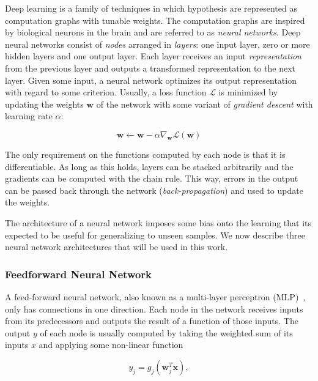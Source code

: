Deep learning is a family of techniques in which hypothesis are represented as computation graphs with tunable weights.
The computation graphs are inspired by biological neurons in the brain and are referred to as \textit{neural networks}.
Deep neural networks consist of \textit{nodes} arranged in \textit{layers}: one input layer, zero or more hidden layers and one output layer.
Each layer receives an input \textit{representation}~\cite{bengio_representation_2013} from the previous layer and outputs a transformed representation to the next layer.
Given some input, a neural network optimizes its output representation with regard to some criterion.
Usually, a loss function \(\mathcal{L}\) is minimized by updating the weights \(\mathbf{w}\) of the network with some variant of \textit{gradient descent} with learning rate \(\alpha\):

\begin{equation}
    \mathbf{w} \leftarrow \mathbf{w} - \alpha \nabla_\mathbf{w} \mathcal{L}(\mathbf{w}) 
\end{equation}

The only requirement on the functions computed by each node is that it is differentiable.
As long as this holds, layers can be stacked arbitrarily and the gradients can be computed with the chain rule.
This way, errors in the output can be passed back through the network (\textit{back-propagation}) and used to update the weights.~\cite{russell_artificial_2021,goodfellow_deep_2016}

The architecture of a neural network imposes some bias onto the learning that its expected to be useful for generalizing to unseen samples.
We now describe three neural network architectures that will be used in this work.

\subsubsection{Feedforward Neural Network}

A feed-forward neural network, also known as a multi-layer perceptron (MLP)~\cite{goodfellow_deep_2016}, only has connections in one direction.
Each node in the network receives inputs from its predecessors and outputs the result of a function of those inputs.
The output \(y\) of each node is usually computed by taking the weighted sum of its inputs \(x\) and applying some non-linear function

\begin{equation}
    y_j = g_j(\mathbf{w}_j^T \mathbf{x}),
\end{equation}

